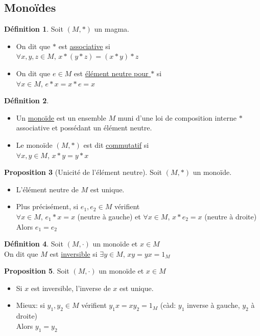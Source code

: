 \documentclass[10pt,a4paper]{article}
\theoremstyle{definition}
\newtheorem{proposition}{Proposition}[section]
\newtheorem{definition}[proposition]{Définition}
\begin{document}
\subsection{Monoïdes}
\begin{definition}
Soit $(M, *)$ un magma.
\begin{itemize}
\item On dit que $*$ est \uline{associative} si \\
$\forall x, y, z \in M$, $x * (y * z) = (x * y) * z$
\item On dit que $e \in M$ est \uline{élément neutre pour $*$} si \\
$\forall x \in M$, $e * x = x * e = x$
\end{itemize}
\end{definition}
\begin{definition}
\hfill
\begin{itemize}
\item Un \uline{monoïde} est un ensemble $M$ muni d'une loi de composition interne $*$ \\
associative et possédant un élément neutre.
\item Le monoïde $(M, *)$ est dit \uline{commutatif} si \\
$\forall x, y \in M$, $x * y = y * x$
\end{itemize}
\end{definition}
\begin{proposition}[Unicité de l'élément neutre]
Soit $(M, *)$ un monoïde.
\begin{itemize}
\item L'élément neutre de $M$ est unique.
\item Plus précisément, si $e_1, e_2 \in M$ vérifient \\
$\forall x \in M$, $e_1 * x = x$ (neutre à gauche) et $\forall x \in M$, $x * e_2 = x$ (neutre à droite) \\
Alors $e_1 = e_2$
\end{itemize}
\end{proposition}
\begin{definition}
Soit $(M, \cdot)$ un monoïde et $x \in M$ \\
On dit que $M$ est \uline{inversible} si $\exists y \in M$, $xy = yx = 1_M$
\end{definition}
\begin{proposition}
Soit $(M, \cdot)$ un monoïde et $x \in M$
\begin{itemize}
\item Si $x$ est inversible, l'inverse de $x$ est unique.
\item Mieux: si $y_1, y_2 \in M$ vérifient $y_1 x = x y_2 = 1_M$ (càd: $y_1$ inverse à gauche, $y_2$ à droite) \\
Alors $y_1 = y_2$
\end{itemize}
\end{proposition}
\end{document}
